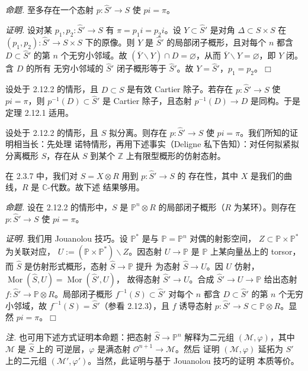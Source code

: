  \emph{命题.} 至多存在一个态射
$p:\widehat{S}'\to S$ 使 $pi=\pi$。

\emph{证明.} 设对某 $p_1,p_2:\widehat{S}'\to S$ 有
$\pi=p_1i=p_2i$。设 $Y\subset\widehat{S}'$ 是对角
$\Delta\subset S\times S$ 在
$(p_1,p_2):\widehat{S}'\to S\times S$ 下的原像。则 $Y$ 是
$\widehat{S}'$ 的局部闭子概形，且对每个 $n$ 都含
$D\subset\widehat{S}'$ 的第 $n$ 个无穷小邻域。故
$(\overline{Y}\backslash Y)\cap D=\varnothing$，从而
$\overline{Y}\backslash Y=\varnothing$，即 $Y$ 闭。含 $D$ 的所有
无穷小邻域的 $\widehat{S}'$ 闭子概形等于 $\widehat{S}'$。故
$Y=\widehat{S}'$，$p_1=p_2$。\hfill$\Box$

 设处于 2.12.2 的情形，且 $D\subset S$ 是有效 Cartier
除子。若存在 $p:\widehat{S}'\to S$ 使 $pi=\pi$，则
$p^{-1}(D)\subset\widehat{S}'$ 是 Cartier 除子，且态射
$p^{-1}(D)\to D$ 是同构。于是定理 2.12.1 适用。


 设处于 2.12.2 的情形，且 $S$ 拟分离。则存在
$p:\widehat{S}'\to S$ 使 $pi=\pi$。我们所知的证明相当长：先处理
诺特情形，再用下述事实（Deligne 私下告知）：对任何拟紧拟分离概形
$S$，存在从 $S$ 到某个 $\mathbb{Z}$ 上有限型概形的仿射态射。

在 2.3.7 中，我们对 $S=X\otimes R$ 用到 $p:\widehat{S}'\to S$ 的
存在性，其中 $X$ 是我们的曲线，$R$ 是 $\mathbb{C}$-代数。故下述
结果够用。

 \emph{命题.} 设在 2.12.2 的情形中，$S$ 是
$\mathbb{P}^{n}\otimes R$ 的局部闭子概形（$R$ 为某环）。则存在
$p:\widehat{S}'\to S$ 使 $pi=\pi$。

\emph{证明.} 我们用 Jouanolou 技巧。设 $\mathbb{P}^{*}$ 是与
$\mathbb{P}=\mathbb{P}^{n}$ 对偶的射影空间，
$Z\subset\mathbb{P}\times\mathbb{P}^{*}$ 为关联对应，
$U:=(\mathbb{P}\times\mathbb{P}^{*})\backslash Z$。因态射
$U\to\mathbb{P}$ 是 $\mathbb{P}$ 上某向量丛上的 torsor，而
$\widehat{S}$ 是仿射形式概形，态射 $\widehat{S}\to\mathbb{P}$ 提升
为态射 $\widehat{S}\to U$。因 $U$ 仿射，
$\operatorname{Mor}(\widehat{S},U)=\operatorname{Mor}(\widehat{S}',U)$，
故得态射 $\widehat{S}'\to U$。合成
$\widehat{S}'\to U\to\mathbb{P}$ 给出态射
$f:\widehat{S}'\to\mathbb{P}\otimes R$。局部闭子概形
$f^{-1}(S)\subset\widehat{S}'$ 对每个 $n$ 都含
$D\subset\widehat{S}'$ 的第 $n$ 个无穷小邻域，故
$f^{-1}(S)=\widehat{S}'$（参看 2.12.3），且 $f$ 诱导态射
$p:\widehat{S}'\to S\subset\mathbb{P}\otimes R$。显然
$pi=\pi$。\hfill$\Box$

\emph{注.} 也可用下述方式证明本命题：把态射
$\widehat{S}\to\mathbb{P}^{n}$ 解释为二元组
$(\mathcal{M},\varphi)$，其中 $\mathcal{M}$ 是 $\widehat{S}$ 上的
可逆层，$\varphi$ 是满态射 $\mathcal{O}^{n+1}\to\mathcal{M}$。然后
证明 $(\mathcal{M},\varphi)$ 延拓为 $\widehat{S}'$ 上的二元组
$(\mathcal{M}',\varphi')$。当然，此证明与基于 Jouanolou 技巧的证明
本质等价。
